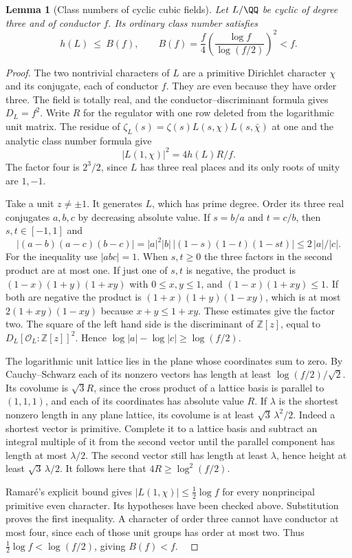 \documentclass[a4paper,11pt]{article}
\newtheorem{lemma}[proposition]{Lemma}
\theoremstyle{definition}
\theoremstyle{remark}
\newcommand{\ZZ}{\mathbb Z}\newcommand{\ord}{\operatorname{ord}}
\numberwithin{equation}{section}
\newcommand{\OO}{\mathcal O}
\begin{document}
\begin{lemma}[Class numbers of cyclic cubic fields]\label{lem:cubic105}
Let \(L/\QQ\) be cyclic of degree three and of conductor \(f\).
Its ordinary class number satisfies
\begin{equation}
 h(L)\ \le\ B(f),\qquad
 B(f)=\frac{f}{4}\left(\frac{\log f}{\log(f/2)}\right)^2<f .
                                                        \label{eq:cubic105}
\end{equation}
\end{lemma}
\begin{proof}
The two nontrivial characters of \(L\) are a primitive Dirichlet
character \(\chi\) and its conjugate, each of conductor \(f\).
They are even because they have order three. The field is totally
real, and the conductor--discriminant formula gives \(D_L=f^2\).
Write \(R\) for the regulator with one row deleted from the
logarithmic unit matrix. The residue of
\(\zeta_L(s)=\zeta(s)L(s,\chi)L(s,\bar\chi)\) at one and the
analytic class number formula give
\[
       |L(1,\chi)|^2=4h(L)R/f .
\]
The factor four is \(2^3/2\), since \(L\) has three real places
and its only roots of unity are \(1,-1\).

Take a unit \(z\ne\pm1\). It generates \(L\), which has prime
degree. Order its three real conjugates \(a,b,c\) by decreasing
absolute value. If \(s=b/a\) and \(t=c/b\), then \(s,t\in[-1,1]\)
and
\[
 |(a-b)(a-c)(b-c)|
    = |a|^2|b|\,|(1-s)(1-t)(1-st)|
    \le 2\,|a|/|c|.
\]
For the inequality use \(|abc|=1\). When \(s,t\ge0\) the three
factors in the second product are at most one. If just one of
\(s,t\) is negative, the product is
\((1-x)(1+y)(1+xy)\) with \(0\le x,y\le1\), and
\((1-x)(1+xy)\le1\). If both are negative the product is
\((1+x)(1+y)(1-xy)\), which is at most \(2(1+xy)(1-xy)\)
because \(x+y\le1+xy\). These estimates give the factor two.
The square of the left hand side is the discriminant of
\(\ZZ[z]\), equal to \(D_L[\OO_L:\ZZ[z]]^2\). Hence
\(\log|a|-\log|c|\ge\log(f/2)\).

The logarithmic unit lattice lies in the plane whose coordinates
sum to zero. By Cauchy--Schwarz each of its nonzero vectors has
length at least \(\log(f/2)/\sqrt2\). Its covolume is
\(\sqrt3 R\), since the cross product of a lattice basis is
parallel to \((1,1,1)\), and each of its coordinates has absolute
value \(R\). If \(\lambda\) is the shortest nonzero length in any
plane lattice, its covolume is at least \(\sqrt3\,\lambda^2/2\).
Indeed a shortest vector is primitive. Complete it to a lattice
basis and subtract an integral multiple of it from the second
vector until the parallel component has length at most
\(\lambda/2\). The second vector still has length at least
\(\lambda\), hence height at least \(\sqrt3\,\lambda/2\).
It follows here that \(4R\ge\log^2(f/2)\).

Ramar\'e's explicit bound gives \(|L(1,\chi)|\le
\tfrac12\log f\) for every nonprincipal primitive even character.
Its hypotheses have been checked above. Substitution proves the
first inequality. A character of order three cannot have conductor
at most four, since each of those unit groups has order at most
two. Thus \(\tfrac12\log f<\log(f/2)\), giving \(B(f)<f\).
~\cite[Cor.~1]{V-III-V-ramare105}
\end{proof}
\end{document}
